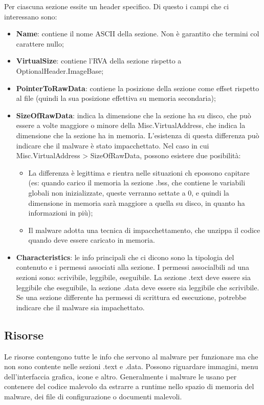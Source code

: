\documentclass[a4paper]{book}
\begin{document}
Per ciascuna sezione essite un header specifico. Di questo i campi che ci interessano sono:
\begin{itemize}
    \item \textbf{Name}: contiene il nome ASCII della sezione. Non è garantito che termini col carattere nullo;
    \item \textbf{VirtualSize}: contiene l'RVA della sezione rispetto a OptionalHeader.ImageBase;
    \item \textbf{PointerToRawData}: contiene la posizione della sezione come effset rispetto al file (quindi la sua posizione effettiva su memoria secondaria);
    \item \textbf{SizeOfRawData}: indica la dimensione che la sezione ha su disco, che può essere a volte maggiore o minore della Misc.VirtualAddress, che indica la dimensione che la sezione ha in memoria. L'esistenza di questa differenza può indicare che il malware è stato impacchettato. Nel caso in cui Misc.VirtualAddress > SizeOfRawData, possono esistere due posibilità:
    \begin{itemize}
        \item La differenza è legittima e rientra nelle situazioni ch epossono capitare (es: quando carico il memoria la sezione .bss, che contiene le variabili globali non inizializzate, queste verranno settate a 0, e quindi la dimensione in memoria sarà maggiore a quella su disco, in quanto ha informazioni in più);
        \item Il malware adotta una tecnica di impacchettamento, che unzippa il codice quando deve essere caricato in memoria. 
    \end{itemize}
     
    \item \textbf{Characteristics}: le info principali che ci dicono sono la tipologia del contenuto e i permessi associati alla sezione. I permessi associalbili ad una sezioni sono: scrivibile, leggibile, eseguibile. La sezione .text deve essere sia leggibile che eseguibile, la sezione .data deve essere sia leggibile che scrivibile. Se una sezione differente ha permessi di scrittura ed esecuzione, potrebbe indicare che il malware sia impachettato. 
\end{itemize}

\subsection{Risorse}
Le risorse contengono tutte le info che servono al malware per funzionare ma che non sono contente nelle sezioni .text e .data. Possono riguardare immagini, menu dell'interfaccia grafica, icone e altro.
Generalmente i malware le usano per contenere del codice malevolo da estrarre a runtime nello spazio di memoria del malware, dei file di configurazione o documenti malevoli.
\\
\end{document}

